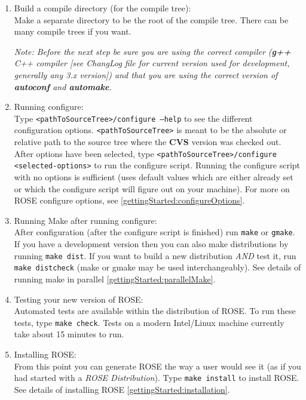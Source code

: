 \begin{enumerate}
     \item Build a compile directory (for the compile tree): \\
     Make a separate directory to be the root of the compile tree. There can be many compile 
     trees if you want.

     {\em Note: Before the next step be sure you are using the correct compiler ({\bf g++}
     C++ compiler
     [see ChangLog file for current version used for development, generally any 3.x
     version]) and that you are using the correct version of {\bf autoconf} and 
     {\bf automake}.}

     \item Running configure: \\
     Type {\tt <pathToSourceTree>/configure --help} to see the different configuration options.
     {\tt <pathToSourceTree>} is meant to be the absolute or relative path to the source tree
     where the {\bf CVS} version was checked out.  After options have been selected, type
     {\tt <pathToSourceTree>/configure <selected-options>} to run the configure script.
     Running the configure script with no options is sufficient (uses default values which
     are either already set or which the configure script will figure out on your machine).
     For more on ROSE configure options, see \ref{gettingStarted:configureOptions}.

     \item Running Make after running configure: \\
     After configuration (after the configure script is finished) run {\tt make} or {\tt gmake}.
     If you have a development version then you can also make distributions by running
     {\tt make dist}.  If you want to build a new distribution {\em AND} test it, 
     run {\tt make distcheck} (make or gmake may be used interchangeably). 
     See details of running make in parallel \ref{gettingStarted:parallelMake}.

     \item Testing your new version of ROSE: \\
     Automated tests are available within the distribution of ROSE. To run these tests,
     type {\tt make check}.  Tests on a modern Intel/Linux machine currently take about 
     15 minutes to run.

     \item Installing ROSE: \\
     From this point you can generate ROSE the way a user would see it (as if you had
     started with a {\em ROSE Distribution}).  Type {\tt make install} to install ROSE.
     See details of installing ROSE \ref{gettingStarted:installation}.


\end{enumerate}

